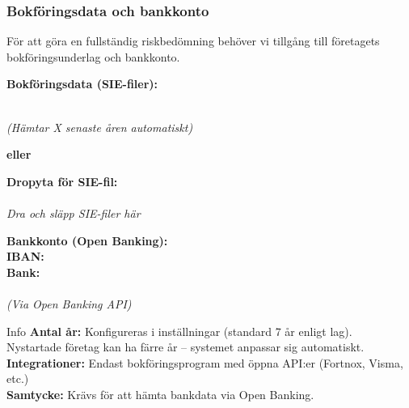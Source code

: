 \documentclass[10pt]{beamer}
\begin{document}
\begin{frame}[label=bokforing_bank]
  \frametitle{Bokföringsdata och bankkonto}
  \small
  För att göra en fullständig riskbedömning behöver vi tillgång till företagets bokföringsunderlag och bankkonto.
  
  \vspace{0.5cm}
  \begin{minipage}{0.48\textwidth}
    \textbf{Bokföringsdata (SIE-filer):}\\
    \vspace{0.3cm}
    
    \\
    \footnotesize\textit{(Hämtar X senaste åren automatiskt)}
    
    \vspace{0.3cm}
    \textbf{eller}\\
    \vspace{0.3cm}
    
    \textbf{Dropyta för SIE-fil:}\\
    \fbox{\rule{5cm}{1.5cm}}\\
    \footnotesize\textit{Dra och släpp SIE-filer här}
    
  \end{minipage}
  \hfill
  \begin{minipage}{0.48\textwidth}
    \textbf{Bankkonto (Open Banking):}\\
    \vspace{0.3cm}
    \textbf{IBAN:} \underline{\hspace{5cm}} \\
    \vspace{0.2cm}
    \textbf{Bank:} \underline{\hspace{5cm}} \\
    \vspace{0.4cm}
    \\
    \footnotesize\textit{(Via Open Banking API)}
  \end{minipage}
  
  \vspace{0.5cm}
  \begin{block}{Info}
    \footnotesize
    \textbf{Antal år:} Konfigureras i inställningar (standard 7 år enligt lag).\\
    Nystartade företag kan ha färre år – systemet anpassar sig automatiskt.\\
    \textbf{Integrationer:} Endast bokföringsprogram med öppna API:er (Fortnox, Visma, etc.)\\
    \textbf{Samtycke:} Krävs för att hämta bankdata via Open Banking.
  \end{block}
  
  \vspace{0.5cm}
  \begin{flushright}
    \hyperlink{nextslide}{}
  \end{flushright}
\end{frame}
\end{document}
